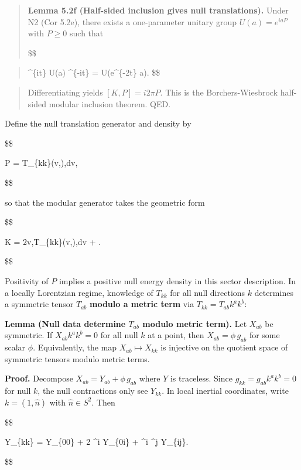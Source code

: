 \documentclass[11pt,a4paper]{article}
\theoremstyle{remark}
\begin{document}
\begin{quote}
\textbf{Lemma 5.2f (Half-sided inclusion gives null translations).} Under N2
(Cor 5.2e), there exists a one-parameter unitary group \(U(a)=e^{i a P}\) with
\(P \ge 0\) such that

\$\$
\end{quote}

\begin{quote}
\Delta\^{}\{it\} U(a) \Delta\^{}\{-it\} = U(e\^{}\{-2\pi t\} a).
\$\$
\end{quote}

\begin{quote}
Differentiating yields \([K,P] = i 2\pi P\). This is the Borchers-Wiesbrock
half-sided modular inclusion theorem. QED.
\end{quote}

Define the null translation generator and density by

\$\$

P = \int T\_\{kk\}(v,\Omega),dv,

\$\$

so that the modular generator takes the geometric form

\$\$

K = 2\pi \int v,T\_\{kk\}(v,\Omega),dv + .

\$\$

Positivity of \(P\) implies a positive null energy density in this sector
description. In a locally Lorentzian regime, knowledge of \(T_{kk}\) for all
null directions \(k\) determines a symmetric tensor \(T_{ab}\) \textbf{modulo a metric
term} via \(T_{kk} = T_{ab} k^a k^b\):

\textbf{Lemma (Null data determine \(T_{ab}\) modulo metric term).} Let \(X_{ab}\)
be symmetric. If \(X_{ab} k^a k^b = 0\) for all null \(k\) at a point, then
\(X_{ab} = \phi \, g_{ab}\) for some scalar \(\phi\). Equivalently, the map
\(X_{ab} \mapsto X_{kk}\) is injective on the quotient space of symmetric
tensors modulo metric terms.

\textbf{Proof.} Decompose \(X_{ab} = Y_{ab} + \phi \, g_{ab}\) where \(Y\) is
traceless. Since \(g_{kk} = g_{ab} k^a k^b = 0\) for null \(k\), the null
contractions only see \(Y_{kk}\). In local inertial coordinates, write
\(k = (1, \hat{n})\) with \(\hat{n} \in S^2\). Then

\$\$

Y\_\{kk\} = Y\_\{00\} + 2 \^{}i Y\_\{0i\} + \^{}i \^{}j Y\_\{ij\}.

\$\$
\end{document}
